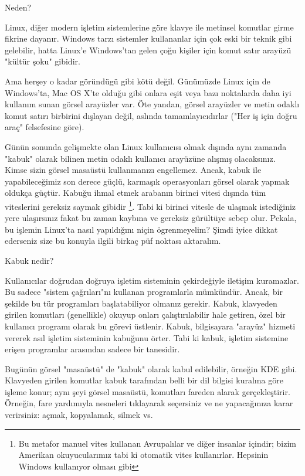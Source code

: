 \documentclass[10pt,a5paper]{book}
\begin{document}
\begin{section}{Neden?}

Linux, diğer modern işletim sistemlerine göre klavye ile metinsel komutlar girme fikrine dayanır. Windows tarzı sistemler kullananlar için çok eski bir teknik gibi gelebilir, hatta Linux'e Windows'tan gelen çoğu kişiler için komut satır arayüzü "kültür şoku" gibidir.

Ama herşey o kadar göründügü gibi kötü değil. Günümüzde Linux için de Windows'ta, Mac OS X'te olduğu gibi onlara eşit veya bazı noktalarda daha iyi kullanım sunan görsel arayüzler var. Öte yandan, görsel arayüzler ve metin odaklı komut satırı birbirini dışlayan değil, aslında tamamlayıcıdırlar ("Her iş için doğru araç" felsefesine göre).

Günün sonunda gelişmekte olan Linux kullanıcısı olmak dışında aynı zamanda "kabuk" olarak bilinen metin odaklı kullanıcı arayüzüne alışmış olacaksınız. Kimse sizin görsel masaüstü kullanmanızı engellemez. Ancak, kabuk ile yapabileceğimiz son derece güçlü, karmaşık operasyonları görsel olarak yapmak oldukça güçtür. Kabuğu ihmal etmek arabanın birinci vitesi dışında tüm viteslerini gereksiz saymak gibidir
\footnote{Bu metafor manuel vites kullanan Avrupalılar ve diğer insanlar içindir; bizim Amerikan okuyucularımız tabi ki otomatik vites kullanırlar.
Hepsinin Windows kullanıyor olması gibi}. Tabi ki birinci vitesle de ulaşmak istediğiniz yere ulaşırsınız fakat bu zaman kaybına ve gereksiz gürültüye sebep olur. Pekala, bu işlemin Linux'ta nasıl yapıldığını niçin ögrenmeyelim? Şimdi iyice dikkat ederseniz size bu konuyla ilgili birkaç püf noktası aktaralım.

\begin{subsection}{Kabuk nedir?}

Kullanıcılar doğrudan doğruya işletim sisteminin çekirdeğiyle iletişim kuramazlar. Bu sadece "sistem çağrıları"nı kullanan programlarla mümkündür. Ancak, bir şekilde bu tür programları başlatabiliyor olmanız gerekir. Kabuk, klavyeden girilen komutları (genellikle) okuyup onları çalıştırılabilir hale getiren, özel bir kullanıcı programı olarak bu görevi üstlenir. Kabuk, bilgisayara "arayüz" hizmeti vererek asıl işletim sisteminin kabuğunu örter. Tabi ki kabuk, işletim sistemine erişen programlar arasından sadece bir tanesidir.

Bugünün görsel "masaüstü" de "kabuk" olarak kabul edilebilir, örneğin KDE gibi. Klavyeden girilen komutlar kabuk tarafından belli bir dil bilgisi kuralına göre işleme konur; aynı şeyi görsel masaüstü, komutları fareden alarak gerçekleştirir. Örneğin, fare yardımıyla nesneleri tıklayarak seçersiniz ve ne yapacağınıza karar verirsiniz: açmak, kopyalamak, silmek vs.


\end{subsection}
\end{section}
\end{document}
